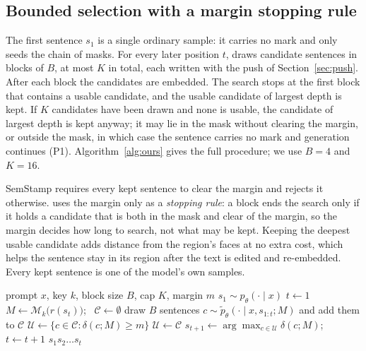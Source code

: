 \subsection{Bounded selection with a margin stopping rule}
\label{sec:selection}

The first sentence $s_1$ is a single ordinary sample: it carries no mark and only seeds the chain of masks. For every
later position $t$, \ours{} draws candidate sentences in blocks of $B$, at most $K$ in total, each written with the push
of Section~\ref{sec:push}. After each block the candidates are embedded. The search stops at the first block that
contains a usable candidate, and the usable candidate of largest depth is kept. If $K$ candidates have been drawn and none
is usable, the candidate of largest depth is kept anyway; it may lie in the mask without clearing the margin, or outside
the mask, in which case the sentence carries no mark and generation continues (P1). Algorithm~\ref{alg:ours} gives the
full procedure; we use $B = 4$ and $K = 16$.

SemStamp requires every kept sentence to clear the margin and rejects it otherwise. \ours{} uses the margin only as a
\emph{stopping rule}: a block ends the search only if it holds a candidate that is both in the mask and clear of the
margin, so the margin decides how long to search, not what may be kept. Keeping the deepest usable candidate adds
distance from the region's faces at no extra cost, which helps the sentence stay in its region after the text is edited
and re-embedded. Every kept sentence is one of the model's own samples.

\begin{algorithm}[t]
\caption{\ours{}: generation of one watermarked text}
\label{alg:ours}
\begin{algorithmic}[1]
\REQUIRE prompt $x$, key $k$, block size $B$, cap $K$, margin $m$
\STATE $s_1 \sim p_\theta(\cdot \mid x)$ 
\STATE $t \gets 1$
  \STATE $M \gets \mathcal{M}_k\big(r(s_t)\big)$; \ $\mathcal{C} \gets \emptyset$
  \REPEAT
    \STATE draw $B$ sentences $c \sim \tilde p_\theta(\cdot \mid x, s_{1:t}; M)$ and add them to $\mathcal{C}$ 
  \STATE $\mathcal{U} \gets \{ c \in \mathcal{C} : \delta(c; M) \ge m \}$
    \STATE $\mathcal{U} \gets \mathcal{C}$ 
  \ENDIF
  \STATE $s_{t+1} \gets \arg\max_{c \in \mathcal{U}} \delta(c; M)$; \ $t \gets t + 1$
\ENDWHILE
\RETURN $s_1 s_2 \dots s_t$
\end{algorithmic}
\end{algorithm}

